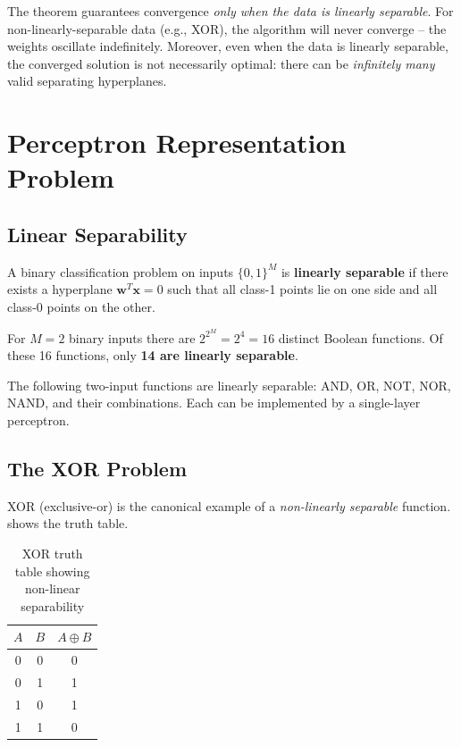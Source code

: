 \documentclass[12pt,a4paper]{article}
\newcommand{\vect}[1]{\mathbf{#1}}
\begin{document}
\begin{keyinsight}[title=What the Convergence Theorem Does Not Guarantee]
The theorem guarantees convergence \emph{only when the data is linearly
separable}.
For non-linearly-separable data (e.g., XOR), the algorithm will never
converge -- the weights oscillate indefinitely.
Moreover, even when the data is linearly separable, the converged
solution is not necessarily optimal: there can be \emph{infinitely
many} valid separating hyperplanes.
\end{keyinsight}

\section{Perceptron Representation Problem}
\label{sec:representation}

\subsection{Linear Separability}
\label{subsec:linear-separability}

A binary classification problem on inputs $\{0, 1\}^M$ is
\textbf{linearly separable} if there exists a hyperplane
$\vect{w}^T \vect{x} = 0$ such that all class-1 points lie on one
side and all class-0 points on the other.

For $M = 2$ binary inputs there are $2^{2^M} = 2^4 = 16$ distinct
Boolean functions.
Of these 16 functions, only \textbf{14 are linearly separable}.

\begin{example}[title=Linearly Separable Boolean Functions]
The following two-input functions are linearly separable:
AND, OR, NOT, NOR, NAND, and their combinations.
Each can be implemented by a single-layer perceptron.
\end{example}

\subsection{The XOR Problem}
\label{subsec:xor}

XOR (exclusive-or) is the canonical example of a \emph{non-linearly
separable} function.
 shows the truth table.

\begin{table}[ht]
\centering
\caption{XOR truth table showing non-linear separability}
\label{tab:xor-truth}
\begin{tabular}{ccc}
\toprule
$A$ & $B$ & $A \oplus B$ \\
\midrule
0 & 0 & 0 \\
0 & 1 & 1 \\
1 & 0 & 1 \\
1 & 1 & 0 \\
\bottomrule
\end{tabular}
\end{table}
\end{document}

